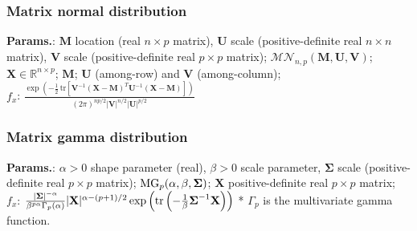     
        
\subsubsection{Matrix normal distribution}





    {\color{darkblue} \textbf{Params.}:} {$\mathbf{M}$ location (real $n\times p$ matrix),  $\mathbf{U}$ scale (positive-definite real $n\times n$ matrix),  $\mathbf{V}$ scale (positive-definite real $p\times p$ matrix)}; {$\mathcal{MN}_{n,p}(\mathbf{M}, \mathbf{U}, \mathbf{V})$}; {$\mathbf{X} \in \mathbb{R}^{n \times p}$}; {$\mathbf{M}$}; {$\mathbf{U}$ (among-row) and $\mathbf{V}$ (among-column)};\hspace{0.5cm}\\{\color{darkblue} \textbf{$f_x$}:} {$\frac{\exp\left( -\frac{1}{2} \, \mathrm{tr}\left[ \mathbf{V}^{-1} (\mathbf{X} - \mathbf{M})^{T} \mathbf{U}^{-1} (\mathbf{X} - \mathbf{M}) \right] \right)}{(2\pi)^{np/2} |\mathbf{V}|^{n/2} |\mathbf{U}|^{p/2}}$}



    
        
\subsubsection{Matrix gamma distribution}





    {\color{darkblue} \textbf{Params.}:} {$\alpha > 0 $ shape parameter (real),  $\beta > 0 $ scale parameter,  $\boldsymbol\Sigma$ scale (positive-definite real $p\times p$ matrix)}; {${\rm MG}_{p}(\alpha,\beta,\boldsymbol\Sigma)$}; {$\mathbf{X}$ positive-definite real $p\times p$ matrix};\hspace{0.5cm}\\{\color{darkblue} \textbf{$f_x$}:} {$\frac{|\boldsymbol\Sigma|^{-\alpha}}{\beta^{p\alpha}\Gamma_p(\alpha)} |\mathbf{X}|^{\alpha-(p+1)/2} \exp\left({\rm tr}\left(-\frac{1}{\beta}\boldsymbol\Sigma^{-1}\mathbf{X}\right)\right)$ * $\Gamma_p$ is the multivariate gamma function.}



